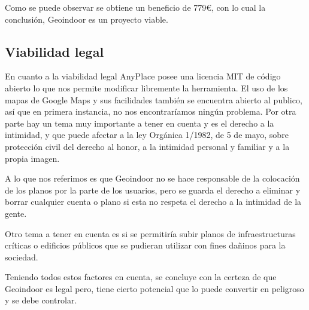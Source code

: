 Como se puede observar se obtiene un beneficio de 779\euro, con lo cual la conclusión, Geoindoor es un proyecto viable.
 
\subsection{Viabilidad legal}

En cuanto a la viabilidad legal AnyPlace posee una licencia MIT de código abierto lo que nos permite modificar libremente la herramienta. El uso de los mapas de Google Maps y sus facilidades también se encuentra abierto al publico, así que en primera instancia, no nos encontraríamos ningún problema.  Por otra parte hay un tema muy importante a tener en cuenta y es el derecho a la intimidad, y que puede afectar a la ley Orgánica 1/1982, de 5 de mayo, sobre protección civil del derecho al honor, a la intimidad personal y familiar y a la propia imagen.

A lo que nos referimos es que Geoindoor no se hace responsable de la colocación de los planos por la parte de los usuarios, pero se guarda el derecho a eliminar y borrar cualquier cuenta o plano si esta no respeta el derecho a la intimidad de la gente.

Otro tema a tener en cuenta es si se permitiría subir planos de infraestructuras críticas o edificios públicos que se pudieran utilizar con fines dañinos para la sociedad.

Teniendo todos estos factores en cuenta, se concluye con la certeza de que Geoindoor es legal pero, tiene cierto potencial que lo puede convertir en peligroso y se debe controlar.
